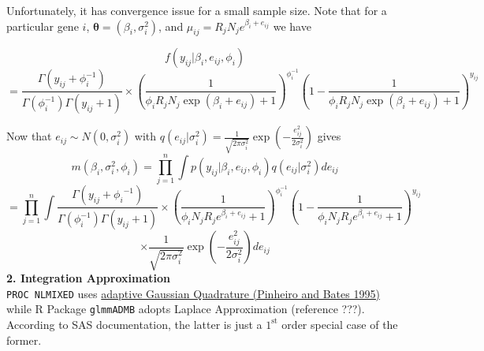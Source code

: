 \documentclass[paper=a4, fontsize=12.5pt]{scrartcl} %
\numberwithin{equation}{section} %
\numberwithin{figure}{section} %
\numberwithin{table}{section} %
\begin{document}
{\color{red}Unfortunately, it has convergence issue for a small sample size.} 
  Note that for a particular gene $i$,  $\bm \theta= (\beta_i, \sigma_i^2)$, and
 $\mu_{ij}= R_jN_je^{\beta_i + e_{ij}}$ we have %

\[f(y_{ij}| \beta_i, e_{ij}, \phi_i)\]
\[= \frac{\Gamma(y_{ij}+ \phi_i^{-1})}{\Gamma(\phi_i^{-1})\Gamma(y_{ij} + 1)}\times \left(\frac{1}{\phi_iR_jN_j\exp(\beta_i  + e_{ij}) + 1}\right)^{\phi_i^{-1}}\left(1-\frac{1}{\phi_iR_jN_j\exp(\beta_i  + e_{ij}) + 1}\right)^{y_{ij}}\]


  Now that $e_{ij}\sim N(0, \sigma_i^2)$ with $q(e_{ij}|\sigma_i^2)= \frac{1}{\sqrt{2\pi\sigma_i^2}}\exp\left(-\frac{e_{ij}^2}{2\sigma_i^2}\right)$ gives 
    \[m(\beta_i, \sigma_i^2, \phi_i)=\prod_{j=1}^n\int p(y_{ij}| \beta_i, e_{ij}, \phi_i)q(e_{ij}|\sigma_i^2)de_{ij}\]  
    \[=\prod_{j= 1}^n\int\frac{\Gamma(y_{ij}+ {\phi_i}^{-1})}{\Gamma(\phi_i^{-1})\Gamma(y_{ij} + 1)}\times \left(\frac{1}{\phi_i N_jR_je^{\beta_i  + e_{ij}} + 1}\right)^{\phi_i^{-1}}\left(1-\frac{1}{\phi_i N_jR_je^{\beta_i  + e_{ij}} + 1}\right)^{y_{ij}} \]
    \[\times \frac{1}{\sqrt{2\pi\sigma_i^2}}\exp\left(-\frac{e_{ij}^2}{2\sigma_i^2}\right)de_{ij} \]
  \textbf{2. Integration Approximation}\\
   \verb"PROC NLMIXED" uses \href{http://citeseerx.ist.psu.edu/viewdoc/download?doi=10.1.1.55.99&rep=rep1&type=pdf}{adaptive Gaussian Quadrature (Pinheiro and Bates 1995)} while R Package \verb"glmmADMB" adopts Laplace Approximation (reference ???). According to SAS documentation, the latter is just a $1^{\text{st}}$ order special case of the former. \\   
   
\end{document}
